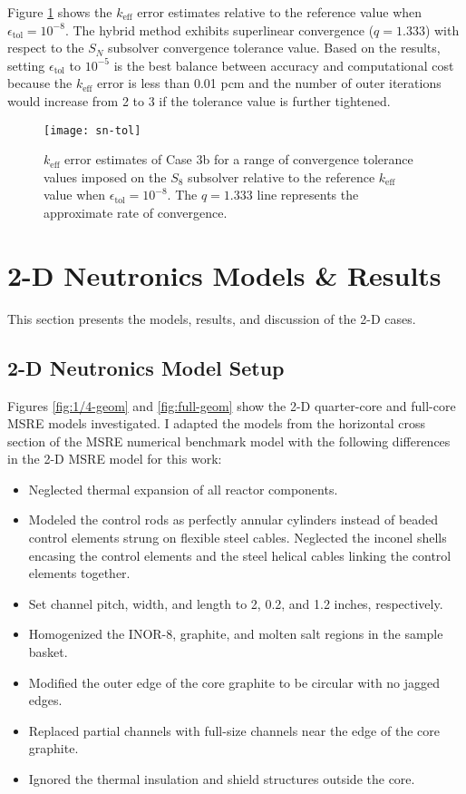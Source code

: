 Figure \ref{fig:sn-tol} shows the $k_\text{eff}$ error estimates relative to the reference value
when $\epsilon_\text{tol}=10^{-8}$. The hybrid method exhibits superlinear convergence ($q=1.333$)
with respect to the $S_N$ subsolver convergence tolerance value. Based on the results, setting
$\epsilon_\text{tol}$ to $10^{-5}$ is the best balance between accuracy and computational
cost because the $k_\text{eff}$ error is less than 0.01 pcm and the number of outer iterations
would increase from 2 to 3 if the tolerance value is further tightened.

\begin{figure}[htb!]
  \centering
  \texttt{[image: sn-tol]}
  \caption{$k_\text{eff}$ error estimates of Case 3b for a range of convergence tolerance values
  imposed on the $S_8$ subsolver relative to the reference $k_\text{eff}$ value when
  $\epsilon_\text{tol}=10^{-8}$. The $q=1.333$ line represents the approximate rate of
  convergence.}
  \label{fig:sn-tol}
\end{figure}

\section{2-D Neutronics Models \& Results} \label{sec:2d-results}

This section presents the models, results, and discussion of the 2-D cases.

\subsection{2-D Neutronics Model Setup} \label{sec:2d-model-setup}

Figures \ref{fig:1/4-geom} and \ref{fig:full-geom} show the 2-D quarter-core and full-core
\gls{MSRE} models investigated. I adapted the models from the horizontal cross section of the
\gls{MSRE} numerical benchmark model \cite{fratoni_molten_2020} with the
following differences in the 2-D \gls{MSRE} model for this work:

\begin{itemize}
  \item Neglected thermal expansion of all reactor components.
  \item Modeled the control rods as perfectly annular cylinders instead of beaded control elements
    strung on flexible steel cables. Neglected the inconel shells encasing the control elements and
    the steel helical cables linking the control elements together.
  \item Set channel pitch, width, and length to 2, 0.2, and 1.2 inches, respectively.
  \item Homogenized the INOR-8, graphite, and molten salt regions in the sample basket.
  \item Modified the outer edge of the core graphite to be circular with no jagged edges.
  \item Replaced partial channels with full-size channels near the edge of the core graphite.
  \item Ignored the thermal insulation and shield structures outside the core.
\end{itemize}

